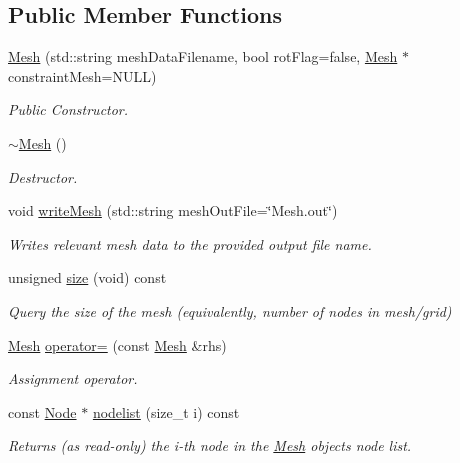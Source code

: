 \subsection*{Public Member Functions}
\begin{DoxyCompactItemize}
\item 
\mbox{\hyperlink{class_mesh_accec9e9595c1e3a0d915344b7dda4a82}{Mesh}} (std\+::string mesh\+Data\+Filename, bool rot\+Flag=false, \mbox{\hyperlink{class_mesh}{Mesh}} $\ast$constraint\+Mesh=N\+U\+LL)
\begin{DoxyCompactList}\small\item\em Public Constructor. \end{DoxyCompactList}\item 
\mbox{\hyperlink{class_mesh_a5efe4da1a4c0971cfb037bd70304c303}{$\sim$\+Mesh}} ()
\begin{DoxyCompactList}\small\item\em Destructor. \end{DoxyCompactList}\item 
void \mbox{\hyperlink{class_mesh_a4d194fe4ce2b4fa4c11274c893c6ae29}{write\+Mesh}} (std\+::string mesh\+Out\+File=\char`\"{}Mesh.\+out\char`\"{})
\begin{DoxyCompactList}\small\item\em Writes relevant mesh data to the provided output file name. \end{DoxyCompactList}\item 
unsigned \mbox{\hyperlink{class_mesh_a716f8cde80ac5f0ed592aaa56995f618}{size}} (void) const
\begin{DoxyCompactList}\small\item\em Query the size of the mesh (equivalently, number of nodes in mesh/grid) \end{DoxyCompactList}\item 
\mbox{\hyperlink{class_mesh}{Mesh}} \mbox{\hyperlink{class_mesh_a732e258583e090537f7c47b9a7594e85}{operator=}} (const \mbox{\hyperlink{class_mesh}{Mesh}} \&rhs)
\begin{DoxyCompactList}\small\item\em Assignment operator. \end{DoxyCompactList}\item 
const \mbox{\hyperlink{class_node}{Node}} $\ast$ \mbox{\hyperlink{class_mesh_afbb98e084a07e94b5d3ad503aaa82e08}{nodelist}} (size\+\_\+t i) const
\begin{DoxyCompactList}\small\item\em Returns (as read-\/only) the i-\/th node in the \mbox{\hyperlink{class_mesh}{Mesh}} objects node list. \end{DoxyCompactList}\end{DoxyCompactItemize}


